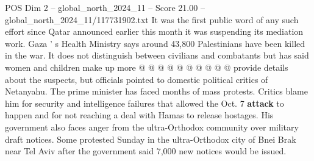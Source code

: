 \begin{textsample}{POS Dim 2 – global\_north\_2024\_11 – Score 21.00 – global\_north\_2024\_11/117731902.txt}
It was the first public word of any such effort since Qatar announced earlier this month it was suspending its mediation work.
Gaza ' s Health Ministry says around 43,800 Palestinians have been killed in the war.
It does not distinguish between civilians and combatants but has said women and children make up more @ @ @ @ @ @ @ @ @ @ provide details about the suspects, but officials pointed to domestic political critics of Netanyahu.
The prime minister has faced months of mass protests.
Critics blame him for security and intelligence failures that allowed the Oct. 7 \textbf{attack} to happen and for not reaching a deal with Hamas to release hostages.
His government also faces anger from the ultra-Orthodox community over military draft notices.
Some protested Sunday in the ultra-Orthodox city of Bnei Brak near Tel Aviv after the government said 7,000 new notices would be issued.

\end{textsample}
